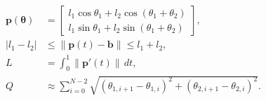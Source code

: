 \begin{align}
\mathbf{p}(\boldsymbol{\theta}) &=
\begin{bmatrix}
l_1\cos\theta_1+l_2\cos(\theta_1+\theta_2)\\
l_1\sin\theta_1+l_2\sin(\theta_1+\theta_2)
\end{bmatrix},\\
|l_1-l_2| &\le \|\mathbf{p}(t)-\mathbf{b}\| \le l_1+l_2,\\
L &= \int_0^1 \|\mathbf{p}'(t)\|\,dt,\\
Q &\approx \sum_{i=0}^{N-2}\sqrt{(\theta_{1,i+1}-\theta_{1,i})^2+(\theta_{2,i+1}-\theta_{2,i})^2}.
\end{align}
